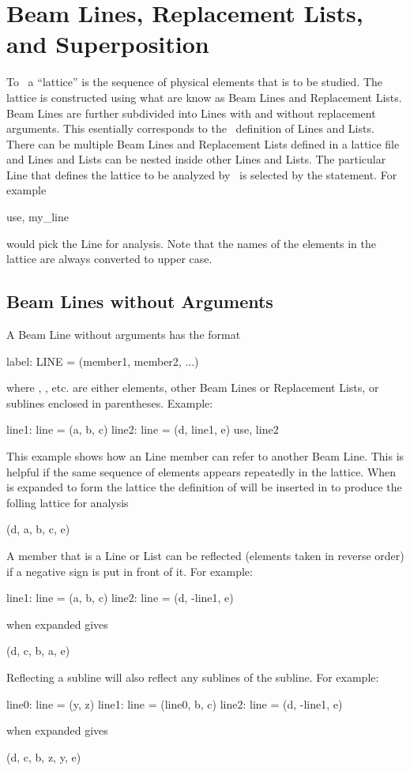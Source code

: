 \chapter{Beam Lines, Replacement Lists, and Superposition}

To \bmad\ a ``lattice'' is the sequence of physical elements that is to be studied.
The lattice is constructed using what are know as Beam Lines and Replacement Lists.
Beam Lines are further subdivided into Lines with and
without replacement arguments. This
esentially corresponds to the \mad\ definition of Lines and Lists. There can be multiple Beam
Lines and Replacement Lists defined in a lattice file and Lines and Lists can be
nested inside other Lines and Lists. The particular Line that defines
the lattice to be analyzed by \bmad\ is selected by the  statement. For example
\begin{example}
  use, my_line
\end{example}
would pick the Line  for analysis. Note that the names of the elements in the
lattice are always converted to upper case.

\section{Beam Lines without Arguments}
A Beam Line without arguments has the format
\begin{example}
  label: LINE = (member1, member2, ...)
\end{example}
where , , etc. are either elements, other Beam Lines or 
Replacement Lists, or sublines enclosed in parentheses.
Example:
\begin{example}
  line1: line = (a, b, c)
  line2: line = (d, line1, e)
  use, line2
\end{example}
This example shows how an Line member can refer to another Beam Line.
This is helpful if the same sequence of elements appears repeatedly in the lattice.
When  is expanded to form the lattice the definition of 
will be inserted 
in to produce the folling lattice for analysis
\begin{example}
  (d, a, b, c, e)
\end{example}

A member that is a Line or List can be reflected (elements taken in reverse order) if
a negative sign is put in front of it. For example:
\begin{example}
  line1: line = (a, b, c)
  line2: line = (d, -line1, e)
\end{example}
 when expanded gives
\begin{example}
  (d, c, b, a, e)
\end{example}
Reflecting a subline will also reflect any sublines of the subline. For example:
\begin{example}
  line0: line = (y, z)
  line1: line = (line0, b, c)
  line2: line = (d, -line1, e)
\end{example}
 when expanded gives
\begin{example}
  (d, c, b, z, y, e)
\end{example}

